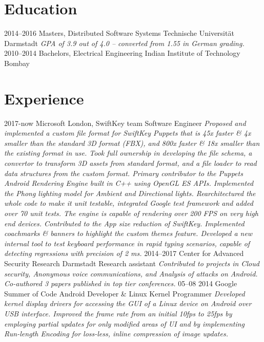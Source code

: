 \documentclass[]{friggeri-cv}
\begin{document}
\section{Education}
    \begin{entrylist}
        \entry
            {2014–2016}
            {Masters, {\normalfont Distributed Software Systems}}
            {Technische Universität Darmstadt}
            {\emph{GPA of 3.9 out of 4.0 -- converted from 1.55 in German grading.}}
        \entry
            {2010–2014}
            {Bachelors, {\normalfont Electrical Engineering}}
            {Indian Institute of Technology Bombay}
            {}%
    \end{entrylist}
    \vspace{-0.3cm}

\section{Experience}
    \begin{entrylist}
        \entry
            {2017-now}
            {Microsoft London, SwiftKey team}
            {Software Engineer}
            {\emph{Proposed and implemented a custom file format for SwiftKey Puppets that is 45x faster \& 4x smaller than the standard 3D format (FBX), and 800x faster \& 18x smaller than the existing format in use. Took full ownership in developing the file schema, a convertor to transform 3D assets from standard format, and a file loader to read data structures from the custom format.
            \newline
            \newline
            Primary contributor to the Puppets Android Rendering Engine built in C++ using OpenGL ES APIs. Implemented the Phong lighting model for Ambient and Directional lights. Rearchitectured the whole code to make it unit testable, integrated Google test framework and added over 70 unit tests. The engine is  capable of rendering over 200 FPS on very high end devices.
            \newline
            \newline
            Contributed to the App size reduction of SwiftKey. Implemented coachmarks \& banners to highlight the custom themes feature. Developed a new internal tool to test keyboard performance in rapid typing scenarios, capable of detecting regressions with precision of 2 ms. }}
        \entry
            {2014–2017}
            {Center for Advanced Security Research Darmstadt}
            {Research assistant}
            {\emph{Contributed to projects in Cloud security, Anonymous voice communications, and Analysis of attacks on Android. Co-authored 3 papers published in top tier conferences.}}
        \entry
            {05–08 2014}
            {Google Summer of Code}
            {Android Developer \& Linux Kernel Programmer}
            {\emph{Developed kernel display drivers for accessing the GUI of a Linux device on Android over USB interface. Improved the frame rate from an initial 10fps to 25fps by employing partial updates for only modified areas of UI and by implementing Run-length Encoding for loss-less, inline compression of image updates.}}
    \end{entrylist}
\end{document}
